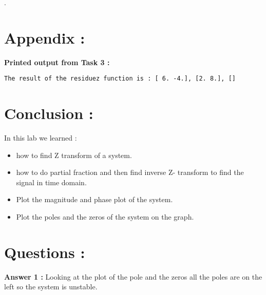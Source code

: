 \documentclass{article}
\begin{document}
.

\section{Appendix :}
\textbf{Printed output from Task 3 :}
\begin{verbatim}
The result of the residuez function is : [ 6. -4.], [2. 8.], []
\end{verbatim}

\section{Conclusion :}
In this lab we learned :
\begin{itemize}
\item how to find Z transform of a system.
\item how to do partial fraction and then find inverse Z- transform to find the signal in time domain.
\item Plot the magnitude and phase plot of the system.
\item Plot the poles and the zeros of the system on the graph.
\end{itemize}

\section{Questions :}
\textbf{Answer 1 :}
Looking at the plot of the pole and the zeros all the poles are on the left so the system is unstable.
\end{document}

